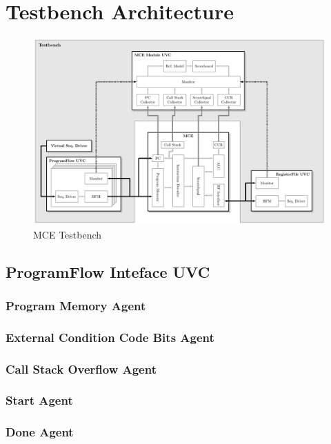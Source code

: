 \section{Testbench Architecture}

\begin{figure}[htb]
 \centering
 \includegraphics[width=1.0\textwidth,angle=0]{images/mce_tb}
 \caption{MCE Testbench}
\label{fig:mce_tb}
\end{figure}

\subsection{ProgramFlow Inteface UVC}

\subsubsection{Program Memory Agent}

\subsubsection{External Condition Code Bits Agent}

\subsubsection{Call Stack Overflow Agent}

\subsubsection{Start Agent}

\subsubsection{Done Agent}

